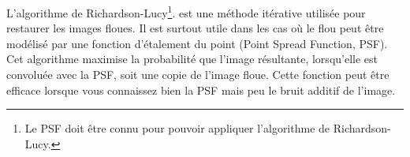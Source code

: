 L'algorithme de Richardson-Lucy\footnote{Le PSF doit être connu pour pouvoir appliquer l'algorithme de Richardson-Lucy.}. est une méthode itérative utilisée pour restaurer les images floues. 
Il est surtout utile dans les cas où le flou peut être modélisé par une fonction d'étalement du point (Point Spread Function, PSF). 
Cet algorithme maximise la probabilité que l'image résultante, lorsqu'elle est convoluée avec la PSF, soit une copie de l'image floue. 
Cette fonction peut être efficace lorsque vous connaissez bien la PSF mais peu le bruit additif de l'image.